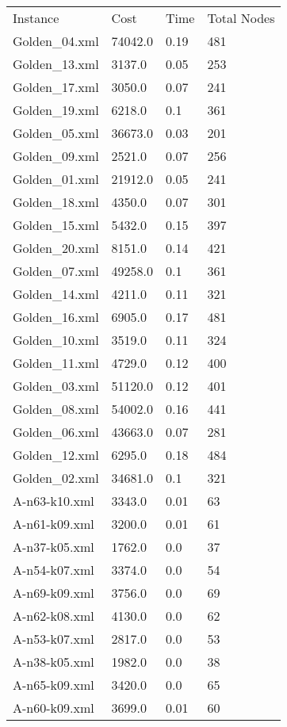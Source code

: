 \documentclass[12pt]{article}
\begin{document}
\begin{appendices}
\begin{table}[]
	\begin{tabular}{llll}
	Instance & Cost & Time & Total Nodes \\
	Golden\_04.xml & 74042.0 & 0.19 & 481 \\
	Golden\_13.xml & 3137.0 & 0.05 & 253 \\
	Golden\_17.xml & 3050.0 & 0.07 & 241 \\
	Golden\_19.xml & 6218.0 & 0.1 & 361 \\
	Golden\_05.xml & 36673.0 & 0.03 & 201 \\
	Golden\_09.xml & 2521.0 & 0.07 & 256 \\
	Golden\_01.xml & 21912.0 & 0.05 & 241 \\
	Golden\_18.xml & 4350.0 & 0.07 & 301 \\
	Golden\_15.xml & 5432.0 & 0.15 & 397 \\
	Golden\_20.xml & 8151.0 & 0.14 & 421 \\
	Golden\_07.xml & 49258.0 & 0.1 & 361 \\
	Golden\_14.xml & 4211.0 & 0.11 & 321 \\
	Golden\_16.xml & 6905.0 & 0.17 & 481 \\
	Golden\_10.xml & 3519.0 & 0.11 & 324 \\
	Golden\_11.xml & 4729.0 & 0.12 & 400 \\
	Golden\_03.xml & 51120.0 & 0.12 & 401 \\
	Golden\_08.xml & 54002.0 & 0.16 & 441 \\
	Golden\_06.xml & 43663.0 & 0.07 & 281 \\
	Golden\_12.xml & 6295.0 & 0.18 & 484 \\
	Golden\_02.xml & 34681.0 & 0.1 & 321 \\
	A-n63-k10.xml & 3343.0 & 0.01 & 63 \\
	A-n61-k09.xml & 3200.0 & 0.01 & 61 \\
	A-n37-k05.xml & 1762.0 & 0.0 & 37 \\
	A-n54-k07.xml & 3374.0 & 0.0 & 54 \\
	A-n69-k09.xml & 3756.0 & 0.0 & 69 \\
	A-n62-k08.xml & 4130.0 & 0.0 & 62 \\
	A-n53-k07.xml & 2817.0 & 0.0 & 53 \\
	A-n38-k05.xml & 1982.0 & 0.0 & 38 \\
	A-n65-k09.xml & 3420.0 & 0.0 & 65 \\
	A-n60-k09.xml & 3699.0 & 0.01 & 60 \\

\end{tabular}
\end{table}
\end{appendices}
\end{document}
